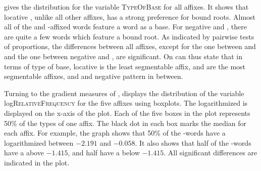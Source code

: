  gives the distribution for the variable \textsc{TypeOfBase} for all affixes. It shows that locative , unlike all other affixes, has a strong preference for bound roots. Almost all of the  and -affixed words feature a word as a base. For negative  and , there are quite a few words which feature a bound root. As indicated by pairwise tests of proportions, the differences between all affixes, except for the one between  and  and the one between negative  and , are significant. On can thus state that in terms of type of base, locative  is the least segmentable affix,  and  are the most segmentable affixes, and  and negative  pattern in between.

\begin{table}
	\caption{Type of base by affix}
	\label{tbl:Corpus distribution type of base}
	

	
\end{table}



Turning to the gradient measures of ,  displays the distribution of the variable log\textsc{RelativeFrequency} 
for the five affixes using boxplots. The logarithmized  is displayed on the x-axis of the plot.  Each of the five boxes in the plot represents 50\% of the types of one affix.  The black dot in each box marks the median  for each affix. For example, the graph shows that 50\% of the -words have a logarithmized  between $-2.191$ and $-0.058$. It also shows that half of the -words have a  above $-1.415$, and half have a  below $-1.415$. All significant differences are indicated in the plot.


